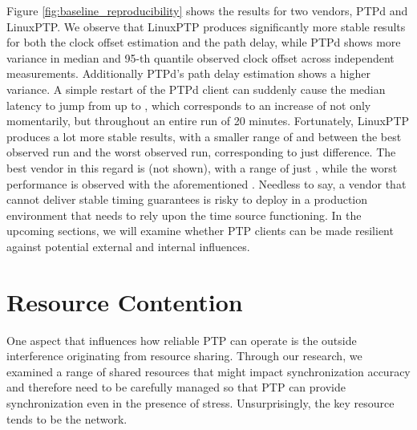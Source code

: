 {

Figure \ref{fig:baseline_reproducibility} shows the results for two vendors, PTPd and LinuxPTP. We observe that LinuxPTP produces significantly more stable results for both the clock offset estimation and the path delay, while PTPd shows more variance in median and 95-th quantile observed clock offset across independent measurements. Additionally PTPd's path delay estimation shows a higher variance. A simple restart of the PTPd client can suddenly cause the median latency to jump from  up to , which corresponds to an increase of  not only momentarily, but throughout an entire run of 20 minutes.
Fortunately, LinuxPTP produces a lot more stable results, with a smaller range of  and  between the best observed run and the worst observed run, corresponding to just  difference. The best vendor in this regard is \fVendor{\cmpMinArg} (not shown), with a range of just \fRelative{\cmpMin}, while the worst performance is observed with the aforementioned \fVendor{\cmpMaxArg}.
%
%
Needless to say, a vendor that cannot deliver stable timing guarantees is risky to deploy in a production environment that needs to rely upon the time source functioning. In the upcoming sections, we will examine whether PTP clients can be made resilient against potential external and internal influences.

}

\section{Resource Contention}

One aspect that influences how reliable PTP can operate is the outside interference originating from resource sharing. Through our research, we examined a range of shared resources that might impact synchronization accuracy and therefore need to be carefully managed so that PTP can provide synchronization even in the presence of stress. Unsurprisingly, the key resource tends to be the network.

